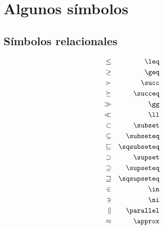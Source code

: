 \documentclass[letterpaper,12pt]{book}
\begin{document}

\appendix
\chapter{Algunos símbolos}

\section{Símbolos relacionales}

\begin{equation*}
\begin{aligned}
\leq & & \verb@\leq@ \\
\geq &	& \verb@\geq@ \\
\succ &	& \verb@\succ@ \\
\succeq & & \verb@\succeq@ \\
\gg	 &	& \verb@\gg@ \\
\ll & & \verb@\ll@ \\
\subset & & \verb@\subset@ \\
\subseteq & & \verb@\subseteq@ \\
\sqsubseteq & & \verb@\sqsubseteq@ \\
\supset & & \verb@\supset@ \\
\supseteq & & \verb@\supseteq@ \\
\sqsupseteq & & \verb@\sqsupseteq@ \\
\in & & \verb@\in@ \\
\ni & & \verb@\ni@ \\
\parallel & & \verb@\parallel@ \\
\approx & & \verb@\approx@
\end{aligned}
\end{equation*}
\end{document}
